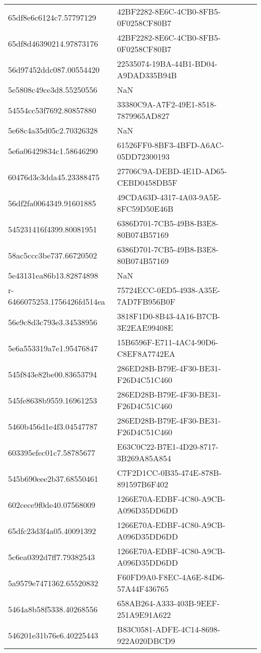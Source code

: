 \begin{tabular}{ll}
65df8e6c6124c7.57797129 & 42BF2282-8E6C-4CB0-8FB5-0F0258CF80B7 \\
65df8d46390214.97873176 & 42BF2282-8E6C-4CB0-8FB5-0F0258CF80B7 \\
56d97452ddc087.00554420 & 22535074-19BA-44B1-BD04-A9DAD335B94B \\
5e5808c49ce3d8.55250556 & NaN \\
54554cc53f7692.80857880 & 33380C9A-A7F2-49E1-8518-7879965AD827 \\
5e68c4a35d05c2.70326328 & NaN \\
5e6a06429834c1.58646290 & 61526FF0-8BF3-4BFD-A6AC-05DD72300193 \\
60476d3c3dda45.23388475 & 27706C9A-DEBD-4E1D-AD65-CEBD0458DB5F \\
56df2fa0064349.91601885 & 49CDA63D-4317-4A03-9A5E-8FC59D50E46B \\
545231416f4399.80081951 & 6386D701-7CB5-49B8-B3E8-80B074B57169 \\
58ac5ccc3be737.66720502 & 6386D701-7CB5-49B8-B3E8-80B074B57169 \\
5e43131ea86b13.82874898 & NaN \\
r-6466075253.1756426fd514ea & 75724ECC-0ED5-4938-A35E-7AD7FB956B0F \\
56e9c8d3c793e3.34538956 & 3818F1D0-8B43-4A16-B7CB-3E2EAE99408E \\
5e6a553319a7e1.95476847 & 15B6596F-E711-4AC4-90D6-C8EF8A7742EA \\
545f843e82be00.83653794 & 286ED28B-B79E-4F30-BE31-F26D4C51C460 \\
545fe8638b9559.16961253 & 286ED28B-B79E-4F30-BE31-F26D4C51C460 \\
5460b456d1e4f3.04547787 & 286ED28B-B79E-4F30-BE31-F26D4C51C460 \\
603395efec01c7.58785677 & E63C0C22-B7E1-4D20-8717-3B269A85A854 \\
545b690eee2b37.68550461 & C7F2D1CC-0B35-474E-878B-891597B6F402 \\
602cece9f0de40.07568009 & 1266E70A-EDBF-4C80-A9CB-A096D35DD6DD \\
65dfc23d3f4a05.40091392 & 1266E70A-EDBF-4C80-A9CB-A096D35DD6DD \\
5c6ea0392d7ff7.79382543 & 1266E70A-EDBF-4C80-A9CB-A096D35DD6DD \\
5a9579e7471362.65520832 & F60FD9A0-F8EC-4A6E-84D6-57A44F436765 \\
5464a8b58f5338.40268556 & 658AB264-A333-403B-9EEF-251A9E91A622 \\
546201e31b76e6.40225443 & B83C0581-ADFE-4C14-8698-922A020DBCD9 \\

\end{tabular}
